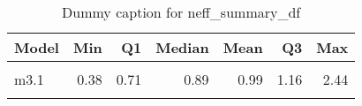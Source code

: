 \begin{table}
\centering
\caption{Dummy caption for neff_summary_df}
\centering
\fontsize{10}{12}\selectfont
\begin{tabular}[t]{lrrrrrr}
\toprule
Model & Min & Q1 & Median & Mean & Q3 & Max\\
\midrule
\cellcolor{gray!10}{m2} & \cellcolor{gray!10}{0.31} & \cellcolor{gray!10}{0.48} & \cellcolor{gray!10}{0.70} & \cellcolor{gray!10}{0.72} & \cellcolor{gray!10}{0.92} & \cellcolor{gray!10}{1.37}\\
m3.1 & 0.38 & 0.71 & 0.89 & 0.99 & 1.16 & 2.44\\
\cellcolor{gray!10}{m4} & \cellcolor{gray!10}{0.43} & \cellcolor{gray!10}{0.51} & \cellcolor{gray!10}{0.81} & \cellcolor{gray!10}{0.94} & \cellcolor{gray!10}{1.20} & \cellcolor{gray!10}{2.30}\\
\bottomrule
\end{tabular}
\end{table}
